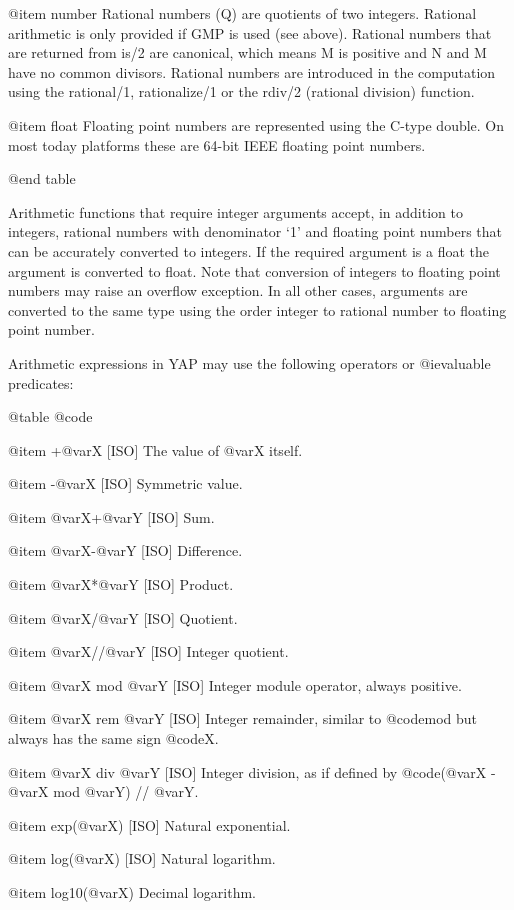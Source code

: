 {{{{@item number
      Rational numbers (Q) are quotients of two integers. Rational
      arithmetic is only provided if GMP is used (see above). Rational
      numbers that are returned from is/2 are canonical, which means M
      is positive and N and M have no common divisors. Rational numbers
      are introduced in the computation using the rational/1,
      rationalize/1 or the rdiv/2 (rational division) function. 

@item float
      Floating point numbers are represented using the C-type double. On most today platforms these are 64-bit IEEE floating point numbers.

@end table

Arithmetic functions that require integer arguments accept, in addition
to integers, rational numbers with denominator `1' and floating point
numbers that can be accurately converted to integers. If the required
argument is a float the argument is converted to float. Note that
conversion of integers to floating point numbers may raise an overflow
exception. In all other cases, arguments are converted to the same type
using the order integer to rational number to floating point number.


Arithmetic expressions in YAP may use the following operators or
@i{evaluable predicates}:

@table @code

@item +@var{X} [ISO]
The value of @var{X} itself.

@item -@var{X} [ISO]
Symmetric value.

@item @var{X}+@var{Y} [ISO]
Sum.

@item @var{X}-@var{Y} [ISO]
Difference.

@item @var{X}*@var{Y} [ISO]
Product.

@item @var{X}/@var{Y} [ISO]
Quotient.

@item @var{X}//@var{Y} [ISO]
Integer quotient.

@item @var{X} mod @var{Y} [ISO]
Integer module operator, always positive.

@item @var{X} rem @var{Y} [ISO]
Integer remainder, similar to @code{mod} but always has the same sign
@code{X}.

@item @var{X} div @var{Y} [ISO]
Integer division, as if defined by @code{(@var{X} - @var{X} mod @var{Y})
// @var{Y}}.

@item exp(@var{X}) [ISO]
Natural exponential.

@item log(@var{X}) [ISO]
Natural logarithm.

@item log10(@var{X})
Decimal logarithm.

}}}}
